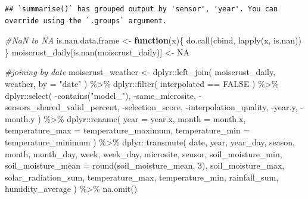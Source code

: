 \documentclass[
  table]{article}
\newenvironment{Shaded}{\begin{snugshade}}{\end{snugshade}}
\newcommand{\AttributeTok}[1]{\textcolor[rgb]{0.77,0.63,0.00}{#1}}
\newcommand{\CommentTok}[1]{\textcolor[rgb]{0.56,0.35,0.01}{\textit{#1}}}
\newcommand{\ConstantTok}[1]{\textcolor[rgb]{0.00,0.00,0.00}{#1}}
\newcommand{\ControlFlowTok}[1]{\textcolor[rgb]{0.13,0.29,0.53}{\textbf{#1}}}
\newcommand{\DecValTok}[1]{\textcolor[rgb]{0.00,0.00,0.81}{#1}}
\newcommand{\FunctionTok}[1]{\textcolor[rgb]{0.00,0.00,0.00}{#1}}
\newcommand{\NormalTok}[1]{#1}
\newcommand{\OtherTok}[1]{\textcolor[rgb]{0.56,0.35,0.01}{#1}}
\newcommand{\SpecialCharTok}[1]{\textcolor[rgb]{0.00,0.00,0.00}{#1}}
\newcommand{\StringTok}[1]{\textcolor[rgb]{0.31,0.60,0.02}{#1}}
\begin{document}
\begin{verbatim}
## `summarise()` has grouped output by 'sensor', 'year'. You can override using the `.groups` argument.
\end{verbatim}

\begin{Shaded}
\begin{Highlighting}[]
\CommentTok{\#NaN to NA}
\NormalTok{is.nan.data.frame }\OtherTok{\textless{}{-}} \ControlFlowTok{function}\NormalTok{(x)\{}
  \FunctionTok{do.call}\NormalTok{(cbind, }\FunctionTok{lapply}\NormalTok{(x, is.nan))}
\NormalTok{\}}
\NormalTok{moiscrust\_daily[}\FunctionTok{is.nan}\NormalTok{(moiscrust\_daily)] }\OtherTok{\textless{}{-}} \ConstantTok{NA}

\CommentTok{\#joining by date}
\NormalTok{moiscrust\_weather }\OtherTok{\textless{}{-}}\NormalTok{ dplyr}\SpecialCharTok{::}\FunctionTok{left\_join}\NormalTok{(}
\NormalTok{  moiscrust\_daily,}
\NormalTok{  weather,}
  \AttributeTok{by =} \StringTok{"date"}
\NormalTok{) }\SpecialCharTok{\%\textgreater{}\%}\NormalTok{ dplyr}\SpecialCharTok{::}\FunctionTok{filter}\NormalTok{(}
\NormalTok{  interpolated }\SpecialCharTok{==} \ConstantTok{FALSE}
\NormalTok{) }\SpecialCharTok{\%\textgreater{}\%} 
\NormalTok{  dplyr}\SpecialCharTok{::}\FunctionTok{select}\NormalTok{(}
    \SpecialCharTok{{-}}\FunctionTok{contains}\NormalTok{(}\StringTok{"model\_"}\NormalTok{),}
    \SpecialCharTok{{-}}\NormalTok{same\_microsite,}
    \SpecialCharTok{{-}}\NormalTok{sensors\_shared\_valid\_percent,}
    \SpecialCharTok{{-}}\NormalTok{selection\_score,}
    \SpecialCharTok{{-}}\NormalTok{interpolation\_quality,}
    \SpecialCharTok{{-}}\NormalTok{year.y,}
    \SpecialCharTok{{-}}\NormalTok{month.y}
\NormalTok{    ) }\SpecialCharTok{\%\textgreater{}\%} 
\NormalTok{  dplyr}\SpecialCharTok{::}\FunctionTok{rename}\NormalTok{(}
    \AttributeTok{year =}\NormalTok{ year.x,}
    \AttributeTok{month =}\NormalTok{ month.x,}
    \AttributeTok{temperature\_max =}\NormalTok{ temperature\_maximum,}
    \AttributeTok{temperature\_min =}\NormalTok{ temperature\_minimum}
\NormalTok{  ) }\SpecialCharTok{\%\textgreater{}\%} 
\NormalTok{  dplyr}\SpecialCharTok{::}\FunctionTok{transmute}\NormalTok{(}
\NormalTok{    date,}
\NormalTok{    year,}
\NormalTok{    year\_day,}
\NormalTok{    season,}
\NormalTok{    month,}
\NormalTok{    month\_day,}
\NormalTok{    week,}
\NormalTok{    week\_day,}
\NormalTok{    microsite,}
\NormalTok{    sensor,}
\NormalTok{    soil\_moisture\_min,}
    \AttributeTok{soil\_moisture\_mean =} \FunctionTok{round}\NormalTok{(soil\_moisture\_mean, }\DecValTok{3}\NormalTok{),}
\NormalTok{    soil\_moisture\_max,}
\NormalTok{    solar\_radiation\_sum,}
\NormalTok{    temperature\_max,}
\NormalTok{    temperature\_min,}
\NormalTok{    rainfall\_sum,}
\NormalTok{    humidity\_average}
\NormalTok{  ) }\SpecialCharTok{\%\textgreater{}\%} 
  \FunctionTok{na.omit}\NormalTok{()}
\end{Highlighting}
\end{Shaded}
\end{document}
